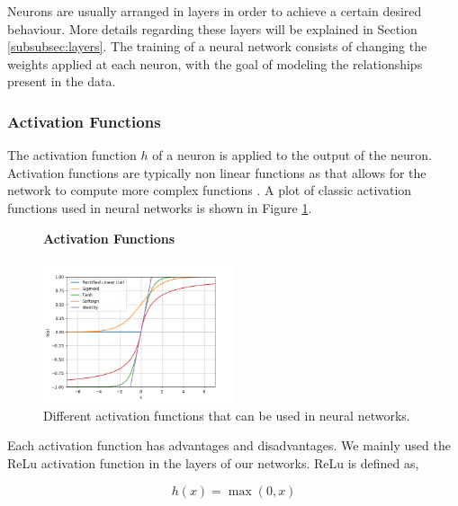 Neurons are usually arranged in layers in order to achieve a certain desired
behaviour. More details regarding these layers will be explained in Section
\ref{subsubsec:layers}. The training of a neural network consists of changing
the weights applied at each neuron, with the goal of modeling the relationships
present in the data.


\subsubsection{Activation Functions} \label{subsubsec:activation_functions}

The activation function $h$ of a neuron is applied to the output of the
neuron. Activation functions are typically non linear functions as that allows
for the network to compute more complex functions \citep{6797088}. A plot
of classic activation functions used in neural networks is shown in Figure
\ref{fig:activation_functions}.

\begin{figure}
    \centering
    \textbf{Activation Functions}\par\medskip
    \includegraphics[width=0.5\textwidth]{./pictures/method/activation_functions.png}
    \caption{Different activation functions that can be used in neural
        networks.}
    \label{fig:activation_functions}
\end{figure}

Each activation function has advantages and disadvantages. We mainly used the
\gls{ReLu} activation function in the layers of our networks. \gls{ReLu} is
defined as,

\begin{equation}
    h(x) = \max(0, x)
\end{equation}

